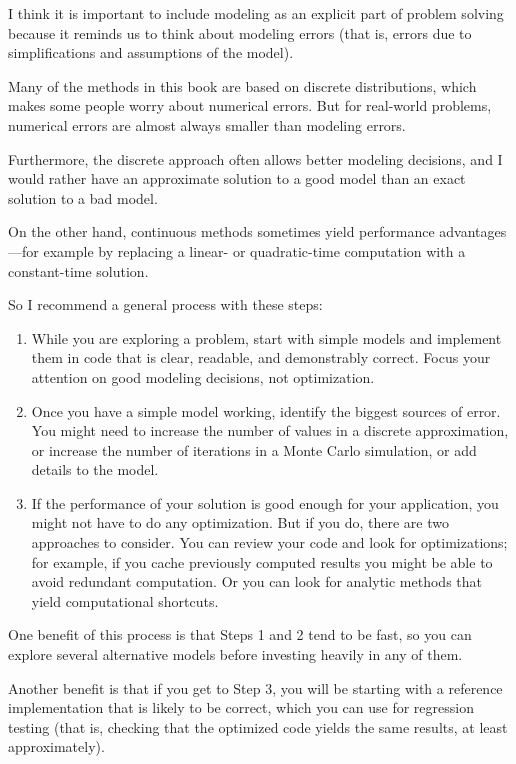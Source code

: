 \documentclass[12pt]{book}
\begin{document}
I think it is important to include modeling as an explicit part
of problem solving because it reminds us to think about modeling
errors (that is, errors due to simplifications and assumptions
of the model).

Many of the methods in this book are based on discrete distributions,
which makes some people worry about numerical errors.  But for
real-world problems, numerical errors are almost always
smaller than modeling errors.

Furthermore, the discrete approach often allows better modeling
decisions, and I would rather have an approximate solution
to a good model than an exact solution to a bad model.

On the other hand, continuous methods sometimes yield performance
advantages---for example by replacing a linear- or quadratic-time
computation with a constant-time solution.

So I recommend a general process with these steps:

\begin{enumerate}

\item While you are exploring a problem, start with simple models and
  implement them in code that is clear, readable, and demonstrably
  correct.  Focus your attention on good modeling decisions, not
  optimization.

\item Once you have a simple model working, identify the
  biggest sources of error.  You might need to increase the number of
  values in a discrete approximation, or increase the number of
  iterations in a Monte Carlo simulation, or add details to the model.

\item If the performance of your solution is good enough for your
  application, you might not have to do any optimization.  But if you
  do, there are two approaches to consider.  You can review your code
  and look for optimizations; for example, if you cache previously
  computed results you might be able to avoid redundant computation.
  Or you can look for analytic methods that yield computational
  shortcuts.

\end{enumerate}

One benefit of this process is that Steps 1 and 2 tend to be fast, so you
can explore several alternative models before investing heavily in any
of them.

Another benefit is that if you get to Step 3, you will be starting
with a reference implementation that is likely to be correct,
which you can use for regression testing (that is, checking that the
optimized code yields the same results, at least approximately).
\end{document}
